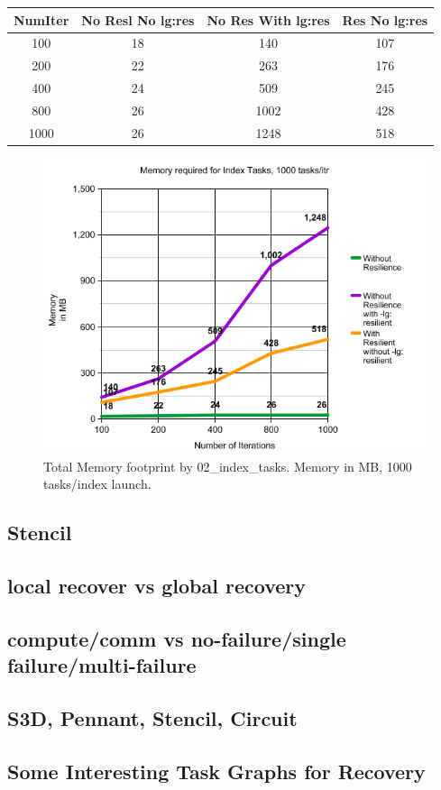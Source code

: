 \begin{center}
 \begin{tabular}{||c | c | c | c||} 
 \hline
 NumIter& No Resl No lg:res & No Res With lg:res & Res No lg:res \\ [0.25ex] 
 \hline\hline
100 &  18 & 140 & 107 \\ 
 \hline
200 &  22 & 263 & 176 \\ 
 \hline
400 &  24 & 509 & 245 \\ 
 \hline
800 &  26 & 1002 & 428\\ 
 \hline
1000 & 26 & 1248 & 518\\ [1ex] 
 \hline
\end{tabular}
\end{center}

\begin{figure}
\includegraphics[width=\textwidth]{images/index_tasks_memory.png}
\caption{Total Memory footprint by 02\_index\_tasks. Memory in MB, 1000 tasks/index launch.}
\end{figure}





\subsection{Stencil}



\subsection{local recover vs global recovery}

\subsection{compute/comm vs no-failure/single failure/multi-failure}

\subsection{S3D, Pennant, Stencil, Circuit}

\subsection{Some Interesting Task Graphs for Recovery}


